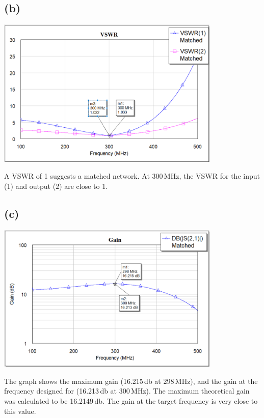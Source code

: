 \documentclass[12pt]{article}
\begin{document}
\subsection*{(b)}
\begin{center}
\includegraphics[width=0.8\textwidth]{1 vswr.png}
\end{center}
  
A VSWR of 1 suggests a matched network. At 300\,\unit{\mega\hertz}, the VSWR for the input (1) and output (2) are close to 1.

\subsection*{(c)}
\begin{center}
\includegraphics[width=0.8\textwidth]{1 gain.png}
\end{center}

The graph shows the maximum gain (16.215\,\unit{\decibel} at 298\,\unit{\mega\hertz}), and the gain at the frequency designed for (16.213\,\unit{\decibel} at 300\,\unit{\mega\hertz}).
The maximum theoretical gain was calculated to be 16.2149\,\unit{\decibel}.
The gain at the target frequency is very close to this value. 
\end{document}
